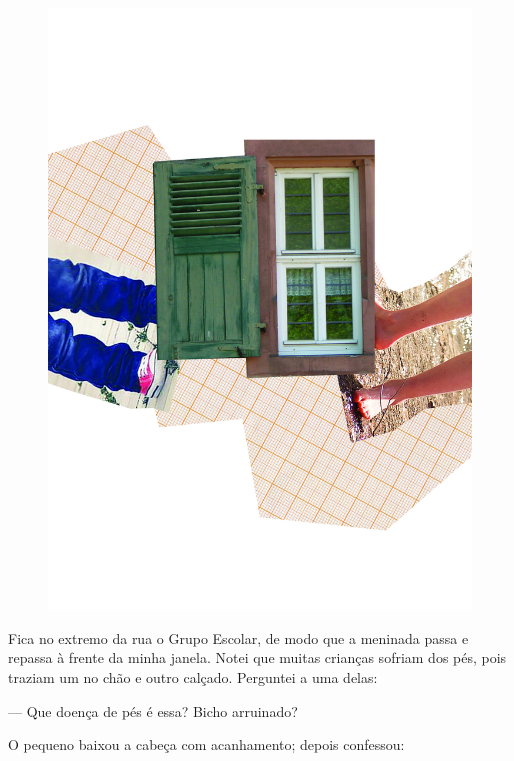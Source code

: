 \pagebreak
\thispagestyle{empty}
\begin{figure}
\includegraphics[width=\textwidth]{./ilustracoes/04_PE.jpg}
\end{figure}
\pagebreak


\noindent{}Fica no extremo da rua o Grupo Escolar, de modo que a meninada passa e
repassa à frente da minha janela. Notei que muitas crianças sofriam dos
pés, pois traziam um no chão e outro calçado. Perguntei a uma delas:

--- Que doença de pés é essa? Bicho arruinado?

O pequeno baixou a cabeça com acanhamento; depois confessou:

